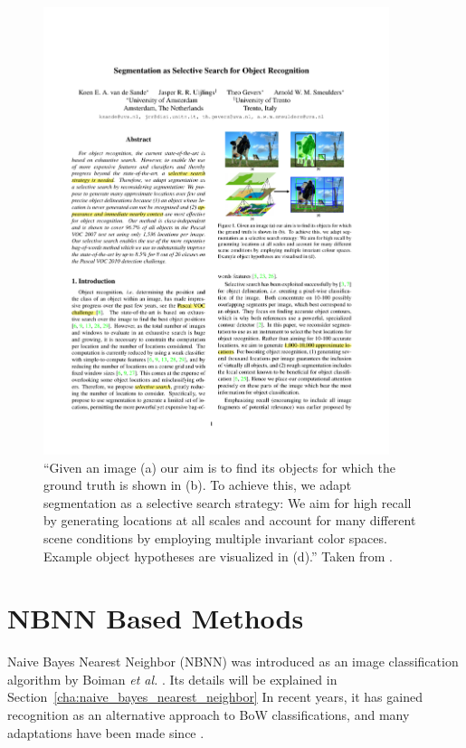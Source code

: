 \begin{figure}[hbt]
    \centering
    \includegraphics[width=0.9\textwidth]{LocByDet}
    \caption{``Given an image (a) our aim is to find its objects for which the ground truth is shown in (b). To achieve this, we adapt segmentation as a selective search strategy: We aim for high recall by generating locations at all scales and account for many different scene conditions by employing multiple invariant color spaces. Example object hypotheses are visualized in (d).'' Taken from \cite{van2011segmentation}.}
    \label{fig:locbydet}
\end{figure}


\section{NBNN Based Methods} %
\label{sec:nbnn_based_methods}

Naive Bayes Nearest Neighbor (NBNN) was introduced as an image classification algorithm by Boiman \emph{et al.} \cite{boiman2008defense}. Its details will be explained in Section~\ref{cha:naive_bayes_nearest_neighbor} In recent years, it has gained recognition as an alternative approach to BoW classifications, and many adaptations have been made since \cite{becker2012codebook, behmo2010towards, mccann2012local, timofte2012iterative, tuytelaars2011nbnn, wang2011improved}.

